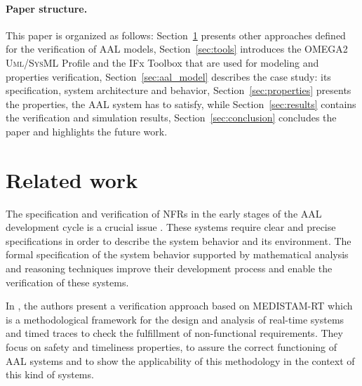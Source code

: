 \documentclass[a4paper,twoside]{article}
\def\myrelax{\textsc{Relax}}                  %
\def\UML{\textsc{Uml}}
\def\SysML{\textsc{SysML}}
\begin{document}

\paragraph*{Paper structure.} This paper is organized as follows: Section~\ref{sec:r_work} presents other approaches defined for the verification of AAL models, Section~\ref{sec:tools} introduces the OMEGA2 \UML{}/\SysML{} Profile and the IFx Toolbox that are used for modeling and properties verification, Section~\ref{sec:aal_model} describes the case study: its specification, system architecture and behavior, Section~\ref{sec:properties} presents the properties, the AAL system has to satisfy, while Section~\ref{sec:results} contains the verification and simulation results, Section~\ref{sec:conclusion} concludes the paper and highlights the future work.

\section{Related work}
\label{sec:r_work}

\noindent The specification and verification of NFRs in the early stages of the AAL development cycle is a crucial issue \cite{test9}. These systems require clear and precise specifications in order to describe the system behavior and its environment. The formal specification of the system behavior supported by mathematical analysis and reasoning techniques improve their development process and enable the verification of these systems. 

In \cite{test10}, the authors present a verification approach based on MEDISTAM-RT which is a methodological framework for the design and analysis of real-time systems and timed traces to check the fulfillment of non-functional requirements. They focus on  safety and timeliness properties, to assure the correct functioning of AAL systems and to show the applicability of this methodology in the context of this kind of systems. 
\end{document}
